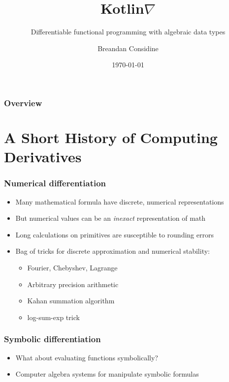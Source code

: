 \documentclass{beamer}
\title{Kotlin\texorpdfstring{$\nabla$}{}}
\subtitle{Differentiable functional programming with algebraic data types}
\author{Breandan Considine}
\institute[UdeM]{
Universit\'e de Montr\'eal \\
\medskip
\textit{breandan.considine@umontreal.ca}
}
\date{\today}
\begin{document}
    \begin{frame}
        \titlepage
    \end{frame}

    \begin{frame}
        \frametitle{Overview}
        \tableofcontents
    \end{frame}

    \section{A Short History of Computing Derivatives}\label{sec:first-section}


    \begin{frame}
        \frametitle{Numerical differentiation}
        \begin{itemize}
            \item Many mathematical formula have discrete, numerical representations
            \item But numerical values can be an \textit{inexact} representation of math
            \item Long calculations on primitives are susceptible to rounding errors
            \item Bag of tricks for discrete approximation and numerical stability:
            \begin{itemize}
                \item Fourier, Chebyshev, Lagrange
                \item Arbitrary precision arithmetic
                \item Kahan summation algorithm
                \item log-sum-exp trick
            \end{itemize}
        \end{itemize}
    \end{frame}


    \begin{frame}
        \frametitle{Symbolic differentiation}
        \begin{itemize}
            \item What about evaluating functions symbolically?
            \item Computer algebra systems for manipulate symbolic formulas
        \end{itemize}
    \end{frame}
\end{document}
